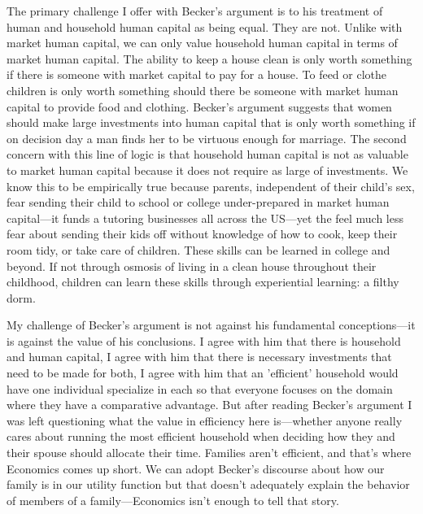 \documentclass{article}
\begin{document}
The primary challenge I offer with Becker's argument is to his treatment of human and household human capital as being equal. They are not. Unlike with market human capital, we can only value household human capital in terms of market human capital. The ability to keep a house clean is only worth something if there is someone with market capital to pay for a house. To feed or clothe children is only worth something should there be someone with market human capital to provide food and clothing. Becker's argument suggests that women should make large investments into human capital that is only worth something if on decision day a man finds her to be virtuous enough for marriage. The second concern with this line of logic is that household human capital is not as valuable to market human capital because it does not require as large of investments. We know this to be empirically true because parents, independent of their child's sex, fear sending their child to school or college under-prepared in market human capital—it funds a tutoring businesses all across the US—yet the feel much less fear about sending their kids off without knowledge of how to cook, keep their room tidy, or take care of children. These skills can be learned in college and beyond. If not through osmosis of living in a clean house throughout their childhood, children can learn these skills through experiential learning: a filthy dorm. 

My challenge of Becker's argument is not against his fundamental conceptions—it is against the value of his conclusions. I agree with him that there is household and human capital, I agree with him that there is necessary investments that need to be made for both, I agree with him that an 'efficient' household would have one individual specialize in each so that everyone focuses on the domain where they have a comparative advantage. But after reading Becker's argument I was left questioning what the value in efficiency here is—whether anyone really cares about running the most efficient household when deciding how they and their spouse should allocate their time. Families aren't efficient, and that's where Economics comes up short. We can adopt Becker's discourse about how our family is in our utility function but that doesn't adequately explain the behavior of members of a family—Economics isn't enough to tell that story.
\end{document}
